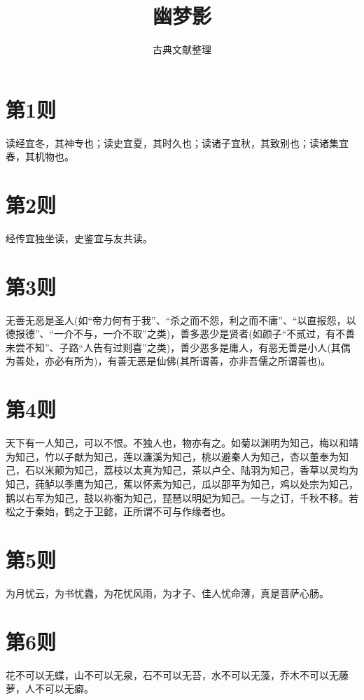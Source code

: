 \documentclass[12pt,a4paper]{ctexbook}
\title{幽梦影}
\author{古典文献整理}
\date{}
\begin{document}
\maketitle
\tableofcontents
\newpage
\section{第1则}
读经宜冬，其神专也；读史宜夏，其时久也；读诸子宜秋，其致别也；读诸集宜春，其机物也。\par

\section{第2则}
经传宜独坐读，史鉴宜与友共读。\par

\section{第3则}
无善无恶是圣人(如“帝力何有于我”、“杀之而不怨，利之而不庸”、“以直报怨，以德报德”、“一介不与，一介不取”之类)，善多恶少是贤者(如颜子“不贰过，有不善未尝不知”、子路“人告有过则喜”之类)，善少恶多是庸人，有恶无善是小人(其偶为善处，亦必有所为)，有善无恶是仙佛(其所谓善，亦非吾儒之所谓善也)。\par

\section{第4则}
天下有一人知己，可以不恨。不独人也，物亦有之。如菊以渊明为知己，梅以和靖为知己，竹以子猷为知己，莲以濂溪为知己，桃以避秦人为知己，杏以董奉为知己，石以米颠为知己，荔枝以太真为知己，茶以卢仝、陆羽为知己，香草以灵均为知己，莼鲈以季鹰为知己，蕉以怀素为知己，瓜以邵平为知己，鸡以处宗为知己，鹅以右军为知己，鼓以祢衡为知己，琵琶以明妃为知己。一与之订，千秋不移。若松之于秦始，鹤之于卫懿，正所谓不可与作缘者也。\par

\section{第5则}
为月忧云，为书忧蠹，为花忧风雨，为才子、佳人忧命薄，真是菩萨心肠。\par

\section{第6则}
花不可以无蝶，山不可以无泉，石不可以无苔，水不可以无藻，乔木不可以无藤萝，人不可以无癖。\par
\end{document}
